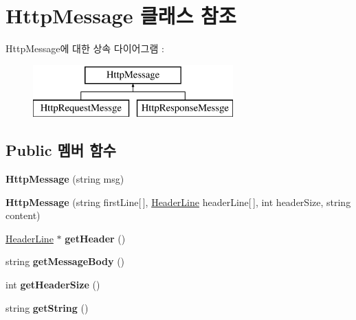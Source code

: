 \hypertarget{class_http_message}{}\section{Http\+Message 클래스 참조}
\label{class_http_message}
Http\+Message에 대한 상속 다이어그램 \+: \begin{figure}[H]
\begin{center}
\leavevmode
\includegraphics[height=2.000000cm]{class_http_message}
\end{center}
\end{figure}
\subsection*{Public 멤버 함수}
\begin{DoxyCompactItemize}
\item 
\mbox{\label{class_http_message_a93cbf59a394c96113807425b1c6bb68a}} 
{\bfseries Http\+Message} (string msg)
\item 
\mbox{\label{class_http_message_aa139c771fc372013df56558d6f61c9d0}} 
{\bfseries Http\+Message} (string first\+Line\mbox{[}$\,$\mbox{]}, \hyperlink{struct_header_line}{Header\+Line} header\+Line\mbox{[}$\,$\mbox{]}, int header\+Size, string content)
\item 
\mbox{\label{class_http_message_adaff26ec4d75c3a452a4ad5ca513e991}} 
\hyperlink{struct_header_line}{Header\+Line} $\ast$ {\bfseries get\+Header} ()
\item 
\mbox{\label{class_http_message_a2cb549126adb8a918de216fe46799b80}} 
string {\bfseries get\+Message\+Body} ()
\item 
\mbox{\label{class_http_message_ac5e7789f4368df8f4c7d8ef933866608}} 
int {\bfseries get\+Header\+Size} ()
\item 
\mbox{\label{class_http_message_aa1229eb8813c168b39a069c305d6d377}} 
string {\bfseries get\+String} ()
\end{DoxyCompactItemize}
